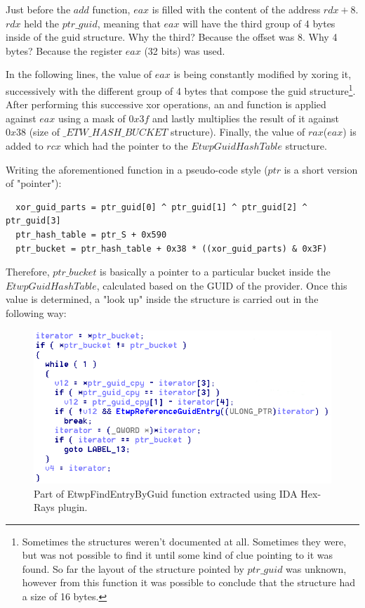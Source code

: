   Just before the $add$ function, $eax$ is filled with the content of the address $rdx+8$. $rdx$ held the $ptr\_guid$, meaning that $eax$ will have the third group of 4 bytes inside of the guid structure. Why the third? Because the offset was 8. Why 4 bytes? Because the register $eax$ (32 bits) was used.

  In the following lines, the value of $eax$ is being constantly modified by xoring it, successively with the different group of 4 bytes that compose the guid structure\footnote{Sometimes the structures weren't documented at all. Sometimes they were, but was not possible to find it until some kind of clue pointing to it was found.  So far the layout of the structure pointed by $ptr\_guid$ was unknown, however from this function it was possible to conclude that the structure had a size of 16 bytes.}. After performing this successive xor operations, an and function is applied against $eax$ using a mask of $0x3f$ and lastly multiplies the result of it against $0x38$ (size of $\_ETW\_HASH\_BUCKET$ structure). Finally, the value of $rax$($eax$) is added to $rcx$ which had the pointer to the $EtwpGuidHashTable$ structure. 

  Writing the aforementioned function in a pseudo-code style ($ptr$ is a short version of "pointer"): 
  \begin{verbatim}
  xor_guid_parts = ptr_guid[0] ^ ptr_guid[1] ^ ptr_guid[2] ^ ptr_guid[3]
  ptr_hash_table = ptr_S + 0x590
  ptr_bucket = ptr_hash_table + 0x38 * ((xor_guid_parts) & 0x3F) 
  \end{verbatim}

  Therefore, $ptr\_bucket$ is basically a pointer to a particular bucket inside the $EtwpGuidHashTable$, calculated based on the GUID of the provider. 
  Once this value is determined, a "look up" inside the structure is carried out in the following way:

  \begin{centering}
  \begin{figure}[H]
    \includegraphics[width=12cm]{images/etwpfindentrybyguid_while.png}
    \caption[]{Part of EtwpFindEntryByGuid function extracted using IDA Hex-Rays plugin.}
    \label{fig:EtwpFindEntryByGuid_while}
  \end{figure}
  \end{centering}

